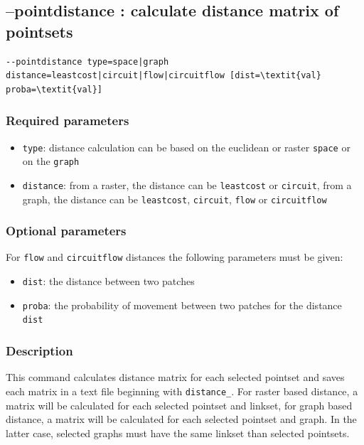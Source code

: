\documentclass[a4paper,10pt]{report}
\begin{document}
\subsection{--pointdistance : calculate distance matrix of pointsets}
\begin{Verbatim}[commandchars=\\\{\}]
--pointdistance type=space|graph distance=leastcost|circuit|flow|circuitflow [dist=\textit{val} proba=\textit{val}]
\end{Verbatim}

\subsubsection{Required parameters}
\begin{itemize}
	\item \verb|type|: distance calculation can be based on the euclidean or raster \verb|space| or on the \verb|graph|
	\item \verb|distance|: from a raster, the distance can be \verb|leastcost| or \verb|circuit|, from a graph, the distance can be \verb|leastcost|, \verb|circuit|, \verb|flow| or \verb|circuitflow|
\end{itemize}

\subsubsection{Optional parameters}
For \verb|flow| and \verb|circuitflow| distances the following parameters must be given:
\begin{itemize}
	\item \verb|dist|: the distance between two patches
	\item \verb|proba|: the probability of movement between two patches for the distance \verb|dist|
\end{itemize}

\subsubsection{Description}
This command calculates distance matrix for each selected pointset and saves each matrix in a text file beginning with \verb|distance_|.
For raster based distance, a matrix will be calculated for each selected pointset and linkset, for graph based distance, a matrix will be calculated for each selected pointset and graph. In the latter case, selected graphs must have the same linkset than selected pointsets.
\end{document}
